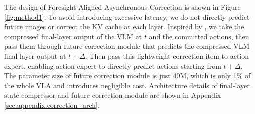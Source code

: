 



The design of Foresight-Aligned Asynchronous Correction is shown in Figure \ref{fig:method1}. To avoid introducing excessive latency, we do not directly predict future images or correct the KV cache at each layer. Inspired by \cite{su2026wog}, we take the compressed final-layer output of the VLM at $t$ and the committed actions, 
then pass them through future correction module that 
predicts the compressed VLM final-layer output at $t+\Delta$. 
Then pass this lightweight correction item to action expert, enabling action expert to directly predict actions starting from $t+\Delta$. 
The parameter size of future correction module is just 40M, which is only 1\% of the whole VLA and introduces negligible cost.
Architecture details of final-layer state compressor and future correction module are shown in Appendix \ref{sec:appendix:correction_arch}.

